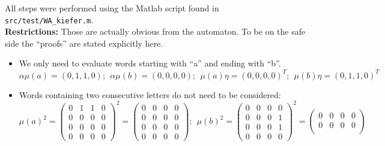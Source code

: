                
            All steps were performed using the Matlab script found in \texttt{src/test/WA_kiefer.m}. \\
            
            \textbf{Restrictions:} Those are actually obvious from the automaton. To be on the safe side the ``proofs'' are stated explicitly here.
            \begin{itemize}
                \item We only need to evaluate words starting with ``a'' and ending with ``b''.
                    \[ \alpha \mu(a) = (0,1,1,0); \ \ \alpha \mu(b) = (0,0,0,0); \ \ \mu(a) \eta = (0,0,0,0)^T; \ \ \mu(b) \eta = (0, 1, 1, 0)^T \]
                \item Words containing two consecutive letters do not need to be considered:
                    \[  \mu(a)^2 = \begin{pmatrix}
                                        0 & 1 & 1 & 0 \\
                                        0 & 0 & 0 & 0 \\
                                        0 & 0 & 0 & 0 \\
                                        0 & 0 & 0 & 0
                                    \end{pmatrix}^2 = \begin{pmatrix}
                                        0 & 0 & 0 & 0 \\
                                        0 & 0 & 0 & 0 \\
                                        0 & 0 & 0 & 0 \\
                                        0 & 0 & 0 & 0
                                    \end{pmatrix};  \ \ \mu(b)^2 = \begin{pmatrix}
                                        0 & 0 & 0 & 0 \\
                                        0 & 0 & 0 & 1 \\
                                        0 & 0 & 0 & 1 \\
                                        0 & 0 & 0 & 0
                                    \end{pmatrix}^2 = \begin{pmatrix}
                                        0 & 0 & 0 & 0 \\
                                        0 & 0 & 0 & 0 \\

\end{pmatrix}\]
\end{itemize}
